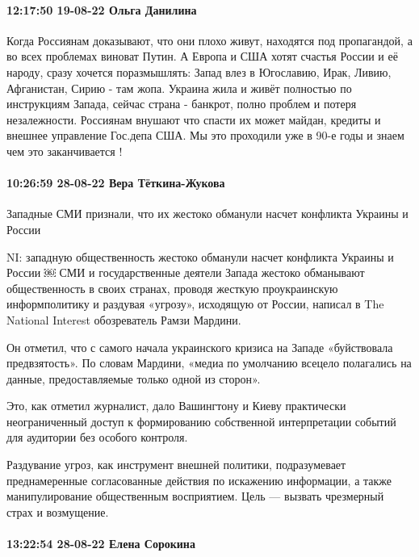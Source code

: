 \paragraph{12:17:50 19-08-22 Ольга Данилина}

Когда Россиянам доказывают, что они плохо живут, находятся под пропагандой, а
во всех проблемах виноват Путин. А Европа и США хотят счастья России и её
народу, сразу хочется поразмышлять: Запад влез в Югославию, Ирак, Ливию,
Афганистан, Сирию - там жопа. Украина жила и живёт полностью по инструкциям
Запада, сейчас страна - банкрот, полно проблем и потеря незалежности. Россиянам
внушают что спасти их может майдан, кредиты и внешнее управление Гос.депа США.
Мы это проходили уже в 90-е годы и знаем чем это заканчивается !

\paragraph{10:26:59 28-08-22 Вера Тёткина-Жукова}

Западные СМИ признали, что их жестоко обманули насчет конфликта Украины и
России

NI: западную общественность жестоко обманули насчет конфликта Украины и России
￼ СМИ и государственные деятели Запада жестоко обманывают общественность в
своих странах, проводя жесткую проукраинскую информполитику и раздувая
«угрозу», исходящую от России, написал в The National Interest обозреватель
Рамзи Мардини.

Он отметил, что с самого начала украинского кризиса на Западе «буйствовала
предвзятость». По словам Мардини, «медиа по умолчанию всецело полагались на
данные, предоставляемые только одной из сторон».

Это, как отметил журналист, дало Вашингтону и Киеву практически неограниченный
доступ к формированию собственной интерпретации событий для аудитории без
особого контроля.

Раздувание угроз, как инструмент внешней политики, подразумевает преднамеренные
согласованные действия по искажению информации, а также манипулирование
общественным восприятием. Цель — вызвать чрезмерный страх и возмущение.

\paragraph{13:22:54 28-08-22 Елена Сорокина}

